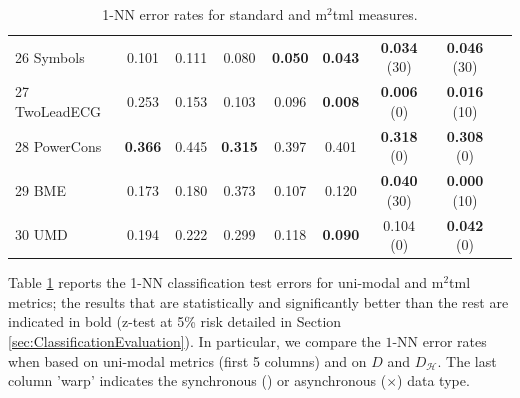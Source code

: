 \begin{table}[h!]
{\begin{tabular}{|l|ccccc|ccc|}
			26 Symbols             & 0.101 & 0.111 & 0.080 & \textbf{0.050} & \textbf{0.043}     & \textbf{0.034} (30) & \textbf{0.046} (30) & \checkmark \\
			27 TwoLeadECG          & 0.253 & 0.153 & 0.103 & 0.096 & \textbf{0.008}   & \textbf{0.006} (0)  & \textbf{0.016} (10) & \checkmark \\
			28 PowerCons           & \textbf{0.366} & 0.445 & \textbf{0.315} & 0.397 & 0.401     & \textbf{0.318} (0)  & \textbf{0.308} (0) & \checkmark \\
			29 BME 				& 0.173 & 0.180 & 0.373 & 0.107 & 0.120     & \textbf{0.040} (30) & \textbf{0.000} (10) 	     & \checkmark \\
			30 UMD 				& 0.194 & 0.222 & 0.299 & 0.118 & \textbf{0.090}     & 0.104  (0)     & \textbf{0.042} (0) & \checkmark \\ 
			\hline
		\end{tabular}
	}
	\caption{1-NN  error rates for standard and {\sc m}$^2${\sc tml} measures.}
	\label{tab-resu}
\end{table}
Table \ref{tab-resu} reports the  1-NN classification test errors for uni-modal and {\sc m}$^2${\sc tml} metrics; the results that are  statistically and significantly better than the rest are indicated in bold (z-test at  5\% risk detailed in Section \ref{sec:ClassificationEvaluation}). In particular, we compare the $1$-NN error rates when based on uni-modal metrics  (first 5 columns) and on  $D$ and $D_{\mathcal{H}}$. The last column '{\sc warp}' indicates the synchronous (\checkmark) or asynchronous ($\times$) data type. 



